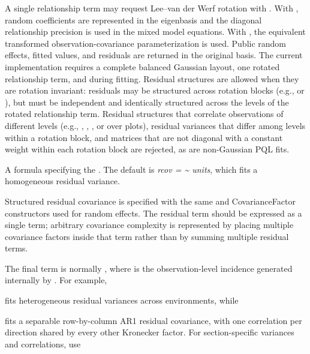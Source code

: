 \documentclass[a4paper]{book}
\begin{document}
\begin{Arguments}
\begin{ldescription}
A single relationship term may request Lee--van der Werf rotation with
. With
, random
coefficients are represented in the eigenbasis and the diagonal relationship
precision is used in the mixed model equations. With
,
the equivalent transformed observation-covariance parameterization is used.
Public random effects, fitted values, and residuals are returned in the
original basis. The current implementation requires a complete balanced
Gaussian layout, one rotated relationship term, and
 during
fitting. Residual structures are allowed when they are rotation invariant:
residuals may be structured across rotation blocks (e.g.,
 or
), but must be independent and
identically structured across the levels of the rotated relationship term.
Residual structures that correlate observations of different levels (e.g.,
, , , or  over plots),
residual variances that differ among levels within a rotation block, and
 matrices that are not diagonal with a constant weight within each
rotation block are rejected, as are non-Gaussian PQL fits.


\item[\code{rcov}] A formula specifying the .
The default is \emph{rcov = \textasciitilde{} units}, which fits a homogeneous residual
variance.

Structured residual covariance is specified with the same
 and CovarianceFactor constructors used for random effects.
The residual term should be expressed as a single  term; arbitrary
covariance complexity is represented by placing multiple covariance factors
inside that term rather than by summing multiple residual terms.

The final term is normally , where  is the
observation-level incidence generated internally by . For example,


fits heterogeneous residual variances across environments, while


fits a separable row-by-column AR1 residual covariance, with one correlation
per direction shared by every other Kronecker factor. For section-specific
variances and correlations, use


\end{ldescription}
\end{Arguments}
\end{document}
